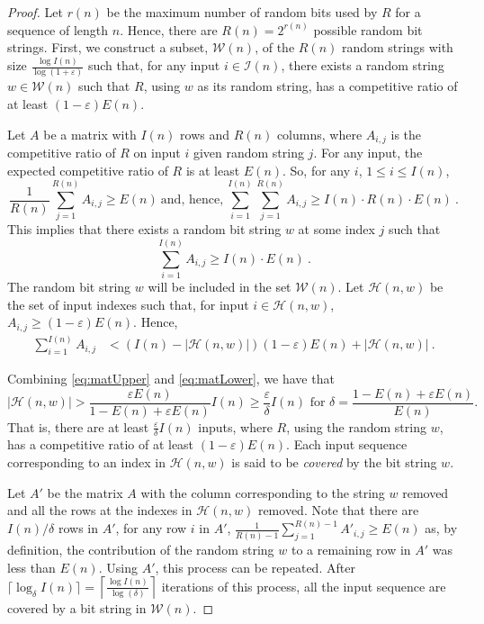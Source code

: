 \documentclass[a4paper]{article}
\newcommand{\eps}{\varepsilon}
\begin{document}
\begin{proof}
  Let $r(n)$ be the maximum number of random bits used by $R$ for a sequence of length $n$. Hence, there are $R(n) = 2^{r(n)}$ possible random bit strings. First, we construct a subset, $\mathcal{W}(n)$, of the $R(n)$ random strings with size $\frac{\log I(n)}{\log (1+\eps)}$ such that, for any input $i \in \mathcal{I}(n)$, there exists a random string $w \in \mathcal{W}(n)$ such that $R$, using $w$ as its random string, has a competitive ratio of at least $(1 - \eps)E(n)$.

Let $A$ be a matrix with $I(n)$ rows and $R(n)$ columns, where $A_{i,j}$ is the competitive ratio of $R$ on input $i$ given random string $j$. For any input, the expected competitive ratio of $R$ is at least $E(n)$. So, for any $i$, $1 \le i \le I(n)$,
$$\frac{1}{R(n)}\sum_{j = 1}^{R(n)} A_{i,j} \ge E(n)~\text{and, hence,}~\sum_{i = 1}^{I(n)}\sum_{j = 1}^{R(n)} A_{i,j} \ge I(n) \cdot R(n) \cdot E(n)~.$$
This implies that there exists a random bit string $w$ at some index $j$ such that
\begin{equation}\label{eq:matUpper}
  \sum_{i = 1}^{I(n)} A_{i,j} \ge I(n) \cdot E(n) ~.
\end{equation}
The random bit string $w$ will be included in the set $\mathcal{W}(n)$. Let $\mathcal{H}(n,w)$ be the set of input indexes such that, for input $i \in \mathcal{H}(n,w)$, $A_{i,j} \ge (1 - \eps)E(n)$.  Hence,
\begin{align}\label{eq:matLower}
  \sum_{i = 1}^{I(n)} A_{i,j} &< (I(n)-|\mathcal{H}(n,w)|)(1 - \eps)E(n) + |\mathcal{H}(n,w)|~.
\end{align}

Combining \eqref{eq:matUpper} and \eqref{eq:matLower}, we have that $$|\mathcal{H}(n,w)| > \frac{\eps E(n)}{1 - E(n) + \eps E(n)}I(n) \ge \frac{\eps}{\delta}I(n) \text{~for~} \delta = \frac{1-E(n)+\eps E(n)}{E(n)}.$$
That is, there are at least $\frac{\eps}{\delta}I(n)$ inputs, where $R$, using the random string $w$, has a competitive ratio of at least $(1 - \eps)E(n)$. Each input sequence corresponding to an index in $\mathcal{H}(n,w)$ is said to be \emph{covered} by the bit string $w$.

Let $A'$ be the matrix $A$ with the column corresponding to the string $w$ removed and all the rows at the indexes in $\mathcal{H}(n,w)$ removed. Note that there are $I(n)/\delta$ rows in $A'$, for any row $i$ in $A'$, $\frac{1}{R(n)-1}\sum_{j = 1}^{R(n)-1} A'_{i,j} \ge E(n)$ as, by definition, the contribution of the random string $w$ to a remaining row in $A'$ was less than $E(n)$. Using $A'$, this process can be repeated. After $\lceil \log_{\delta} I(n) \rceil = \left \lceil \frac{\log I(n)}{\log (\delta)} \right \rceil$ iterations of this process, all the input sequence are covered by a bit string in $\mathcal{W}(n)$.


\end{proof}
\end{document}

